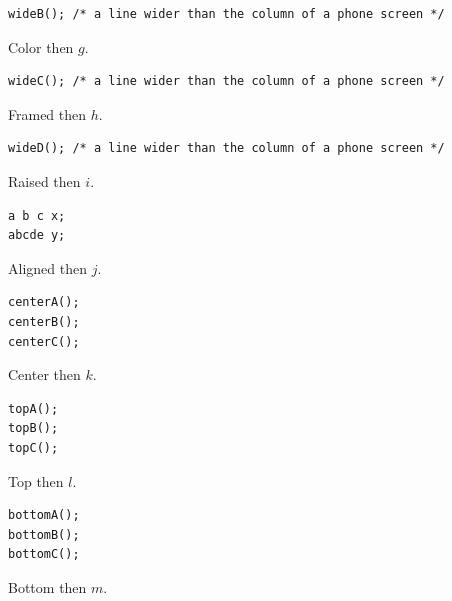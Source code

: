 \documentclass{article}
\begin{document}
\begin{lrbox}{\lstbox}\begin{lstlisting}
wideB(); /* a line wider than the column of a phone screen */
\end{lstlisting}\end{lrbox}
Color  then $g$.

\begin{lrbox}{\lstbox}\begin{lstlisting}
wideC(); /* a line wider than the column of a phone screen */
\end{lstlisting}\end{lrbox}
Framed \colorbox{yellow}{} then $h$.

\begin{lrbox}{\lstbox}\begin{lstlisting}
wideD(); /* a line wider than the column of a phone screen */
\end{lstlisting}\end{lrbox}
Raised \fbox{\raisebox{1pt}{\usebox{\lstbox}}} then $i$.

\begin{lrbox}{\lstbox}\begin{lstlisting}
a b c x;
abcde y;
\end{lstlisting}\end{lrbox}
Aligned \fbox{\usebox{\lstbox}} then $j$.

\begin{lrbox}{\lstbox}\begin{lstlisting}
centerA();
centerB();
centerC();
\end{lstlisting}\end{lrbox}
Center \fbox{\usebox{\lstbox}} then $k$.

\begin{lrbox}{\lstbox}\begin{lstlisting}[boxpos=t]
topA();
topB();
topC();
\end{lstlisting}\end{lrbox}
Top \fbox{\usebox{\lstbox}} then $l$.

\begin{lrbox}{\lstbox}\begin{lstlisting}[boxpos=b]
bottomA();
bottomB();
bottomC();
\end{lstlisting}\end{lrbox}
Bottom \fbox{\usebox{\lstbox}} then $m$.
\end{document}
